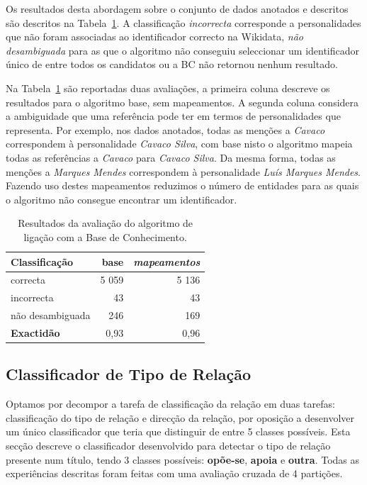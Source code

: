 \documentclass[a4paper, twocolumn, 11pt, twoside]{article}
\begin{document}
Os resultados desta abordagem sobre o conjunto de dados anotados e descritos são descritos na Tabela~\ref{tab:ent_linking_results}. A classificação \textit{incorrecta} corresponde a personalidades que não foram associadas ao identificador correcto na Wikidata, \textit{não desambiguada} para as que o algoritmo não conseguiu seleccionar um identificador único de entre todos os candidatos ou a BC não retornou nenhum resultado.

Na Tabela~\ref{tab:ent_linking_results} são reportadas duas avaliações, a primeira coluna descreve os resultados para o algoritmo base, sem mapeamentos. A segunda coluna considera a ambiguidade que uma referência pode ter em termos de personalidades que representa. Por exemplo, nos dados anotados, todas as menções a \textit{Cavaco} correspondem à personalidade \textit{Cavaco Silva}, com base nisto o algoritmo mapeia todas as referências a \textit{Cavaco} para \textit{Cavaco Silva}. Da mesma forma, todas as menções a \textit{Marques Mendes} correspondem à personalidade \textit{Luís Marques Mendes}. Fazendo uso destes mapeamentos reduzimos o número de entidades para as quais o algoritmo não consegue encontrar um identificador.

\begin{table}[!h]
    \begin{center}
    \begin{tabular}{l rr}
        {\bf Classificação} & {\bf base} & \it{{\bf mapeamentos}} \\
        \hline
        correcta            &   5 059    &  5 136   \\
        incorrecta          &      43    &     43   \\
		não desambiguada    &     246    &    169   \\    
        \hline
		{\bf Exactidão }    &    0,93	 &  0,96   \\
    \end{tabular}
	\caption{Resultados da avaliação do algoritmo de ligação com a Base de Conhecimento.}
	\label{tab:ent_linking_results}
	\end{center}
\end{table}

\subsection{Classificador de Tipo de Relação}
\label{subsec:rel_classifier}

Optamos por decompor a tarefa de classificação da relação em duas tarefas: classificação do tipo de relação e direcção da relação, por oposição a desenvolver um único classificador que teria que distinguir de entre 5 classes possíveis. Esta secção descreve o classificador desenvolvido para detectar o tipo de relação presente num título, tendo 3 classes possíveis: \textbf{opõe-se}, \textbf{apoia} e \textbf{outra}. Todas as experiências descritas foram feitas com uma avaliação cruzada de 4 partições.
\end{document}
